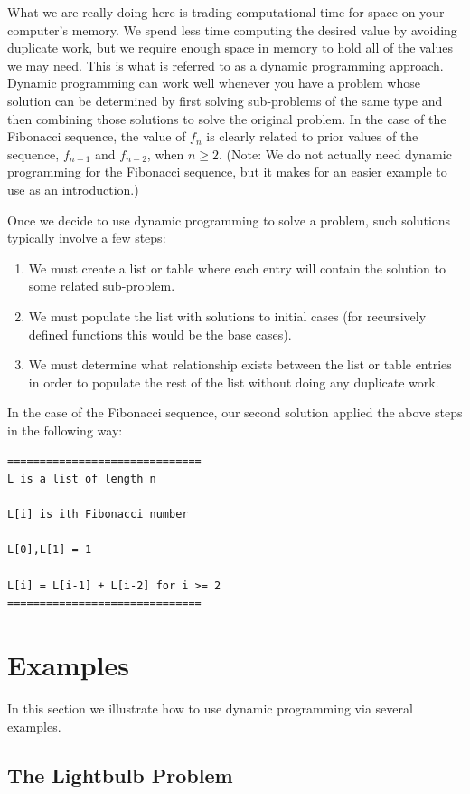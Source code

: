 \documentclass{ximera}
\begin{document}
What we are really doing here is trading computational time for space on your computer's memory. We spend less time computing the desired value by avoiding duplicate work, but we require enough space in memory to hold all of the values we may need. This is what is referred to as a dynamic programming approach. Dynamic programming can work well whenever you have a problem whose solution can be determined by first solving sub-problems of the same type and then combining those solutions to solve the original problem. In the case of the Fibonacci sequence, the value of $f_n$ is clearly related to prior values of the sequence, $f_{n-1}$ and $f_{n-2}$, when $n\geq 2$. (Note: We do not actually need dynamic programming for the Fibonacci sequence, but it makes for an easier example to use as an introduction.)

Once we decide to use dynamic programming to solve a problem, such solutions typically involve a few steps:
\begin{enumerate}
	\item We must create a list or table where each entry will contain the solution to some related sub-problem.
	\item We must populate the list with solutions to initial cases (for recursively defined functions this would be the base cases).
	\item We must determine what relationship exists between the list or table entries in order to populate the rest of the list without doing any duplicate work.
\end{enumerate}

In the case of the Fibonacci sequence, our second solution applied the above steps in the following way:
\begin{verbatim}
==============================
L is a list of length n

L[i] is ith Fibonacci number

L[0],L[1] = 1

L[i] = L[i-1] + L[i-2] for i >= 2
==============================
\end{verbatim}

\section{Examples}

In this section we illustrate how to use dynamic programming via several examples.

\subsection{The Lightbulb Problem}
\end{document}
